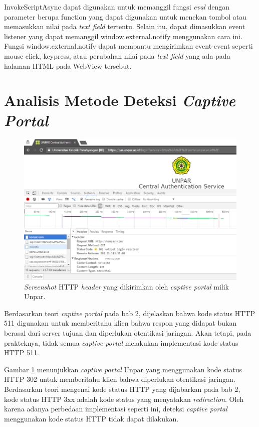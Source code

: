 InvokeScriptAsync dapat digunakan untuk memanggil fungsi \textit{eval} dengan parameter berupa function yang dapat digunakan untuk menekan tombol atau memasukkan nilai pada \textit{text field} tertentu. Selain itu, dapat dimasukkan event listener yang dapat memanggil window.external.notify menggunakan cara ini. Fungsi window.external.notify dapat membantu mengirimkan event-event seperti mouse click, keypress, atau perubahan nilai pada \textit{text field} yang ada pada halaman HTML pada WebView tersebut.



\section{Analisis Metode Deteksi \textit{Captive Portal}}
\label{sec:deteksi_captive_portal}

\begin{figure}[h]
    \centering
    \includegraphics[scale=0.45]{Gambar/Inspect.png}
    \caption[\textit{Screenshot} HTTP \textit{header} yang dikirimkan oleh \textit{captive portal} milik Unpar.]{\textit{Screenshot} HTTP \textit{header} yang dikirimkan oleh \textit{captive portal} milik Unpar.} 
    \label{fig:inspect}
\end{figure}

Berdasarkan teori \textit{captive portal} pada bab 2, dijelaskan bahwa kode status HTTP 511 digunakan untuk memberitahu klien bahwa respon yang didapat bukan berasal dari server tujuan dan diperlukan otentikasi jaringan. Akan tetapi, pada prakteknya, tidak semua \textit{captive portal} melakukan implementasi kode status HTTP 511.

Gambar \ref{fig:inspect} menunjukkan \textit{captive portal} Unpar yang menggunakan kode status HTTP 302 untuk memberitahu klien bahwa diperlukan otentikasi jaringan. Berdasarkan teori mengenai kode status HTTP yang dijabarkan pada bab 2, kode status HTTP 3xx adalah kode status yang menyatakan \textit{redirection}. Oleh karena adanya perbedaan implementasi seperti ini, deteksi \textit{captive portal} menggunakan kode status HTTP tidak dapat dilakukan.

